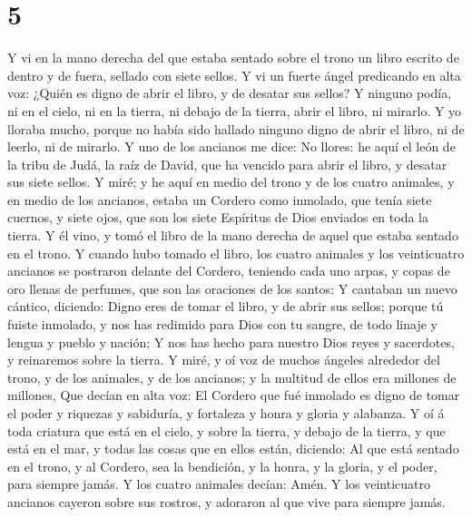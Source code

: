 \hypertarget{section-4}{%
\section{5}\label{section-4}}

 Y vi en la mano derecha del que estaba sentado sobre el
trono un libro escrito de dentro y de fuera, sellado con siete sellos.
 Y vi un fuerte ángel predicando en alta voz: ¿Quién es
digno de abrir el libro, y de desatar sus sellos?  Y
ninguno podía, ni en el cielo, ni en la tierra, ni debajo de la tierra,
abrir el libro, ni mirarlo.  Y yo lloraba mucho, porque no
había sido hallado ninguno digno de abrir el libro, ni de leerlo, ni de
mirarlo.  Y uno de los ancianos me dice: No llores: he
aquí el león de la tribu de Judá, la raíz de David, que ha vencido para
abrir el libro, y desatar sus siete sellos.  Y miré; y he
aquí en medio del trono y de los cuatro animales, y en medio de los
ancianos, estaba un Cordero como inmolado, que tenía siete cuernos, y
siete ojos, que son los siete Espíritus de Dios enviados en toda la
tierra.  Y él vino, y tomó el libro de la mano derecha de
aquel que estaba sentado en el trono.  Y cuando hubo
tomado el libro, los cuatro animales y los veinticuatro ancianos se
postraron delante del Cordero, teniendo cada uno arpas, y copas de oro
llenas de perfumes, que son las oraciones de los santos: 
Y cantaban un nuevo cántico, diciendo: Digno eres de tomar el libro, y
de abrir sus sellos; porque tú fuiste inmolado, y nos has redimido para
Dios con tu sangre, de todo linaje y lengua y pueblo y nación;
 Y nos has hecho para nuestro Dios reyes y sacerdotes, y
reinaremos sobre la tierra.  Y miré, y oí voz de muchos
ángeles alrededor del trono, y de los animales, y de los ancianos; y la
multitud de ellos era millones de millones,  Que decían
en alta voz: El Cordero que fué inmolado es digno de tomar el poder y
riquezas y sabiduría, y fortaleza y honra y gloria y alabanza.
 Y oí á toda criatura que está en el cielo, y sobre la
tierra, y debajo de la tierra, y que está en el mar, y todas las cosas
que en ellos están, diciendo: Al que está sentado en el trono, y al
Cordero, sea la bendición, y la honra, y la gloria, y el poder, para
siempre jamás.  Y los cuatro animales decían: Amén. Y los
veinticuatro ancianos cayeron sobre sus rostros, y adoraron al que vive
para siempre jamás.

